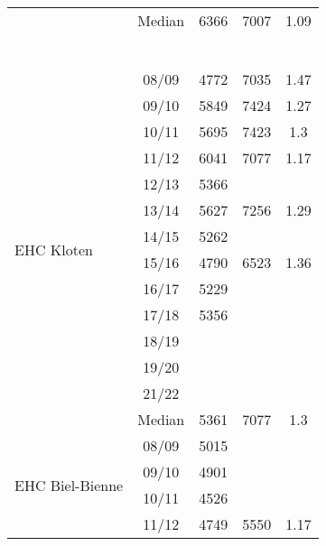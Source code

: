 \begin{longtable}[c]{p{5cm}cccc}
                                 \cmidrule{2-5}
                                 & Median & 6366 & 7007 & 1.09 \\
    \cmidrule{1-5}
     \multicolumn{5}{c}{} \\
    \multicolumn{5}{c}{} \\
    \multicolumn{5}{c}{} \\
    \multicolumn{5}{c}{} \\ 
    \multicolumn{5}{c}{} \\
    \multicolumn{5}{c}{} \\                            
    \multirow[t]{14}{=}{EHC Kloten}   & 08/09 & 4772 & 7035 & 1.47 \\ 
                                     & 09/10 & 5849 & 7424 & 1.27 \\ 
                                     & 10/11 & 5695 & 7423 & 1.3 \\ 
                                     & 11/12 & 6041 & 7077 & 1.17 \\ 
                                     & 12/13 & 5366 & ~ & ~ \\ 
                                     & 13/14 & 5627 & 7256 & 1.29 \\ 
                                     & 14/15 & 5262 & ~ & ~ \\ 
                                     & 15/16 & 4790 & 6523 & 1.36 \\ 
                                     & 16/17 & 5229 & ~ & ~ \\ 
                                     & 17/18 & 5356 & ~ & ~ \\ 
                                     & 18/19 & ~ & ~ & ~ \\ 
                                     & 19/20 & ~ & ~ & ~ \\ 
                                     & 21/22 & ~ & ~ & ~ \\ 
                                     \cmidrule{2-5}
                                     & Median & 5361 & 7077 & 1.3 \\ 
                                     \cmidrule{1-5}
    \multirow[t]{14}{=}{EHC Biel-Bienne}   & 08/09 & 5015 & ~ & ~ \\ 
                                             & 09/10 & 4901 & ~ & ~ \\ 
                                             & 10/11 & 4526 & ~ & ~ \\ 
                                             & 11/12 & 4749 & 5550 & 1.17 \\ 

\end{longtable}
